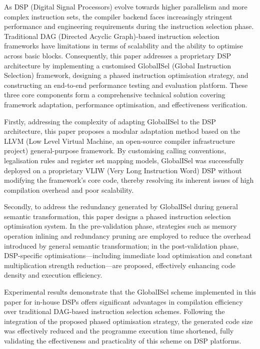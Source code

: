 \documentclass[type=master]{fduthesis}
\begin{document}
	\begin{abstract*}
	As DSP (Digital Signal Processors) evolve towards higher parallelism and more complex instruction sets, the compiler backend faces increasingly stringent performance and engineering requirements during the instruction selection phase. Traditional DAG (Directed Acyclic Graph)-based instruction selection frameworks have limitations in terms of scalability and the ability to optimise across basic blocks. Consequently, this paper addresses a proprietary DSP architecture by implementing a customised GlobalISel (Global Instruction Selection) framework, designing a phased instruction optimisation strategy, and constructing an end-to-end performance testing and evaluation platform. These three core components form a comprehensive technical solution covering framework adaptation, performance optimisation, and effectiveness verification.

	Firstly, addressing the complexity of adapting GlobalISel to the DSP architecture, this paper proposes a modular adaptation method based on the LLVM (Low Level Virtual Machine, an open-source compiler infrastructure project) general-purpose framework. By customising calling conventions, legalisation rules and register set mapping models, GlobalISel was successfully deployed on a proprietary VLIW (Very Long Instruction Word) DSP without modifying the framework’s core code, thereby resolving its inherent issues of high compilation overhead and poor scalability.

	Secondly, to address the redundancy generated by GlobalISel during general semantic transformation, this paper designs a phased instruction selection optimisation system. In the pre-validation phase, strategies such as memory operation inlining and redundancy pruning are employed to reduce the overhead introduced by general semantic transformation; in the post-validation phase, DSP-specific optimisations—including immediate load optimisation and constant multiplication strength reduction—are proposed, effectively enhancing code density and execution efficiency.

	Experimental results demonstrate that the GlobalISel scheme implemented in this paper for in-house DSPs offers significant advantages in compilation efficiency over traditional DAG-based instruction selection schemes. Following the integration of the proposed phased optimisation strategy, the generated code size was effectively reduced and the programme execution time shortened, fully validating the effectiveness and practicality of this scheme on DSP platforms.


\end{abstract*}
\end{document}
